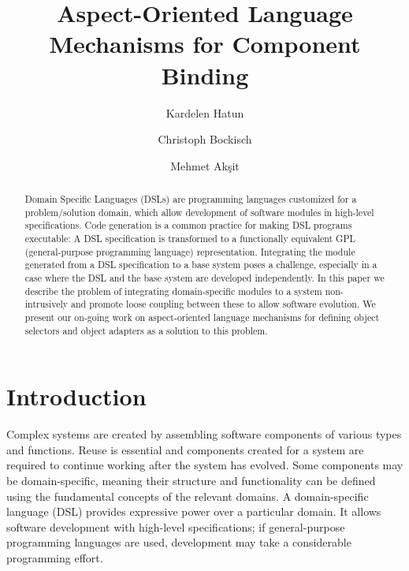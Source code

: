 \documentclass{llncs}
\begin{document}
\title{Aspect-Oriented Language Mechanisms for Component Binding}

\author{Kardelen Hatun \and Christoph Bockisch \and Mehmet Ak\c{s}it}


\maketitle 

\begin{abstract}{Domain Specific Languages (DSLs) are programming
languages customized for a problem/solution domain, which allow development of
software modules in high-level specifications. Code generation is a common practice
for making DSL programs executable: A DSL specification is transformed to a functionally equivalent GPL
(general-purpose programming language) representation. Integrating the module
generated from a DSL specification to a base system poses a challenge, especially in a case
where the DSL and the base system are developed independently.
In this paper we describe the problem of integrating domain-specific
modules to a system non-intrusively and promote loose coupling between these to
allow software evolution. We present our on-going work on aspect-oriented language mechanisms for defining object selectors and object adapters as a solution to this problem.}
\end{abstract}

\section{Introduction}
Complex systems are created by assembling software components of various types
and functions. Reuse is essential and
components created for a system are required to continue working after the system has
evolved. Some components may be
domain-specific, meaning their structure and functionality can be defined using
the fundamental concepts of the relevant domains. A domain-specific language
(DSL) provides expressive power over a particular domain. It allows software
development with high-level specifications; if general-purpose programming languages
are used, development may take a considerable programming effort. 
\end{document}
